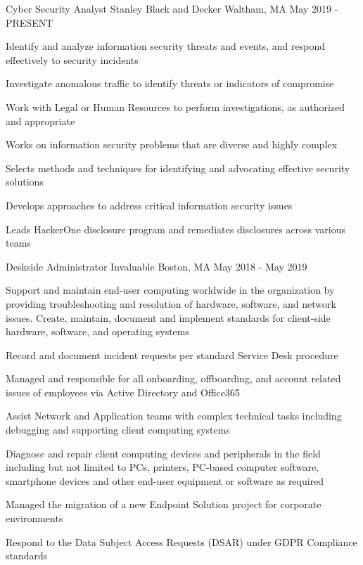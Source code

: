 
\begin{cventries}
  \cventry
    {Cyber Security Analyst} %
    {Stanley Black and Decker} %
    {Waltham, MA} %
    {May 2019 - PRESENT} %
    {
      \begin{cvitems} %
        \item {Identify and analyze information security threats and events, and respond effectively to security incidents}
        \item {Investigate anomalous traffic to identify threats or indicators of compromise}
        \item {Work with Legal or Human Resources to perform investigations, as authorized and appropriate}
        \item {Works on information security problems that are diverse and highly complex}
        \item {Selects methods and techniques for identifying and advocating effective security solutions}
        \item {Develops approaches to address critical information security issues}
        \item {Leads HackerOne disclosure program and remediates disclosures across various teams}
      \end{cvitems}
    }

  \cventry
    {Deskside Administrator} %
    {Invaluable} %
    {Boston, MA} %
    {May 2018 - May 2019} %
    {
      \begin{cvitems} %
        \item {Support and maintain end-user computing worldwide in the organization by providing troubleshooting and
        resolution of hardware, software, and network issues. Create, maintain, document and implement standards for
        client-side hardware, software, and operating systems}
        \item {Record and document incident requests per standard Service Desk procedure}
        \item {Managed and responsible for all onboarding, offboarding, and account related issues of employees via Active
        Directory and Office365}
        \item {Assist Network and Application teams with complex technical tasks including debugging and supporting client
        computing systems}
        \item {Diagnose and repair client computing devices and peripherals in the field including but not limited to PCs,
        printers, PC-based computer software, smartphone devices and other end-user equipment or software as
        required}
        \item {Managed the migration of a new Endpoint Solution project for corporate environments}
        \item {Respond to the Data Subject Access Requests (DSAR) under GDPR Compliance standards}
      \end{cvitems}
    }


\end{cventries}
